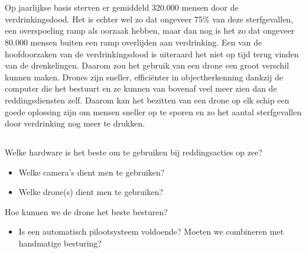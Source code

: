 
\chapter{}
\label{ch:inleiding}

\section{}
\label{sec:probleemstelling}

Op jaarlijkse basis sterven er gemiddeld 320.000 mensen door de verdrinkingsdood. Het is echter wel zo dat ongeveer 75\% van deze sterfgevallen, een overspoeling ramp als oorzaak hebben, maar dan nog is het zo dat ongeveer 80.000 mensen buiten een ramp overlijden aan verdrinking. \autocite{WorldHealthOrganisation} Een van de hoofdoorzaken van de verdrinkingsdood is uiteraard het niet op tijd terug vinden van de drenkelingen. Daarom zou het gebruik van een drone een groot verschil kunnen maken. Drones zijn sneller, efficiënter in objectherkenning dankzij de computer die het bestuurt en ze kunnen van bovenaf veel meer zien dan de reddingsdiensten zelf. Daarom kan het bezitten van een drone op elk schip een goede oplossing zijn om mensen sneller op te sporen en zo het aantal sterfgevallen door verdrinking nog meer te drukken.

\section{}
\label{sec:onderzoeksvraag}

Welke hardware is het beste om te gebruiken bij reddingsacties op zee?

\begin{itemize}
	\item Welke camera's dient men te gebruiken?
	\item Welke drone(s) dient men te gebruiken?
\end{itemize}

Hoe kunnen we de drone het beste besturen?

\begin{itemize}
	\item Is een automatisch pilootsysteem voldoende? Moeten we combineren met handmatige besturing?
\end{itemize}

